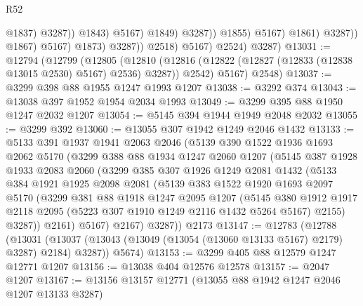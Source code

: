 \begin{lexlean}{R52}
\begin{coremodule}
                                                @1837)
                                              @3287))
                                          @1843)
                                        @5167)
                                      @1849)
                                    @3287))
                                @1855)
                              @5167)
                            @1861)
                          @3287))
                      @1867)
                    @5167)
                  @1873)
                @3287))
            @2518)
          @5167)
        @2524)
      @3287)
@13031 := @12794
    (@12799
      (@12805
        (@12810 (@12816 (@12822 (@12827 (@12833 (@12838 @13015 @2530) @5167) @2536) @3287)) @2542)
        @5167)
      @2548)
@13037 := @3299 @398 @88 @1955 @1247 @1993 @1207
@13038 := @3292 @374
@13043 := @13038 @397 @1952 @1954 @2034 @1993
@13049 := @3299 @395 @88 @1950 @1247 @2032 @1207
@13054 := @5145 @394 @1944 @1949 @2048 @2032
@13055 := @3299 @392
@13060 := @13055 @307 @1942 @1249 @2046 @1432
@13133 := @5133
    @391
    @1937
    @1941
    @2063
    @2046
    (@5139
      @390
      @1522
      @1936
      @1693
      @2062
      @5170
      (@3299
        @388
        @88
        @1934
        @1247
        @2060
        @1207
        (@5145
          @387
          @1928
          @1933
          @2083
          @2060
          (@3299
            @385
            @307
            @1926
            @1249
            @2081
            @1432
            (@5133
              @384
              @1921
              @1925
              @2098
              @2081
              (@5139
                @383
                @1522
                @1920
                @1693
                @2097
                @5170
                (@3299
                  @381
                  @88
                  @1918
                  @1247
                  @2095
                  @1207
                  (@5145
                    @380
                    @1912
                    @1917
                    @2118
                    @2095
                    (@5223 @307 @1910 @1249 @2116 @1432 @5264 @5167)
                    @2155)
                  @3287))
              @2161)
            @5167)
          @2167)
        @3287))
    @2173
@13147 := @12783
    (@12788
      (@13031 (@13037 (@13043 (@13049 (@13054 (@13060 @13133 @5167) @2179) @3287) @2184) @3287))
      @5674)
@13153 := @3299 @405 @88 @12579 @1247 @12771 @1207
@13156 := @13038 @404 @12576 @12578
@13157 := @2047 @1207
@13167 := @13156 @13157 @12771 (@13055 @88 @1942 @1247 @2046 @1207 @13133 @3287)

\end{coremodule}
\end{lexlean}
